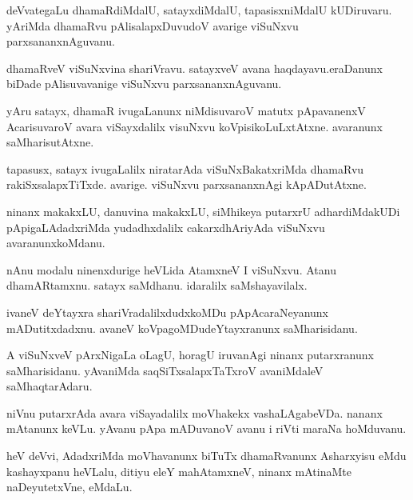 \documentclass{article}
\begin{document}
\begin{mn}
deVvategaLu dhamaRdiMdalU, satayxdiMdalU, tapasisxniMdalU kUDiruvaru. 
yAriMda dhamaRvu pAlisalapxDuvudoV avarige viSuNxvu parxsananxnAguvanu.
\end{mn}

\begin{mn}
dhamaRveV viSuNxvina shariVravu. satayxveV avana haqdayavu.eraDanunx biDade 
pAlisuvavanige viSuNxvu parxsananxnAguvanu.
\end{mn}

\begin{mn}
yAru satayx, dhamaR ivugaLanunx niMdisuvaroV matutx pApavanenxV AcarisuvaroV
avara viSayxdalilx visuNxvu koVpisikoLuLxtAtxne. avaranunx saMharisutAtxne.
\end{mn}

\begin{mn}
tapasusx, satayx ivugaLalilx niratarAda viSuNxBakatxriMda dhamaRvu rakiSxsalapxTiTxde.
avarige. viSuNxvu parxsananxnAgi kApADutAtxne.
\end{mn}

\begin{mn}
ninanx makakxLU, danuvina makakxLU, siMhikeya putarxrU adhardiMdakUDi 
pApigaLAdadxriMda yudadhxdalilx cakarxdhAriyAda viSuNxvu avaranunxkoMdanu.
\end{mn}

\begin{mn}
nAnu modalu ninenxdurige heVLida AtamxneV I viSuNxvu. Atanu dhamARtamxnu. 
satayx saMdhanu. idaralilx saMshayavilalx.
\end{mn}

\begin{mn}
ivaneV deYtayxra shariVradalilxdudxkoMDu pApAcaraNeyanunx mADutitxdadxnu. 
avaneV koVpagoMDudeYtayxranunx saMharisidanu.
\end{mn}

\begin{mn}
A viSuNxveV pArxNigaLa oLagU, horagU iruvanAgi ninanx putarxranunx saMharisidanu. 
 yAvaniMda saqSiTxsalapxTaTxroV avaniMdaleV saMhaqtarAdaru.
\end{mn}

\begin{mn}
niVnu putarxrAda avara viSayadalilx moVhakekx vashaLAgabeVDa. nananx 
mAtanunx keVLu. yAvanu pApa mADuvanoV avanu i riVti maraNa hoMduvanu.
\end{mn}

\begin{mn}
heV deVvi, AdadxriMda moVhavanunx biTuTx dhamaRvanunx Asharxyisu eMdu
kashayxpanu heVLalu, ditiyu eleY mahAtamxneV, ninanx mAtinaMte naDeyutetxVne, eMdaLu.
\end{mn}
\end{document}
